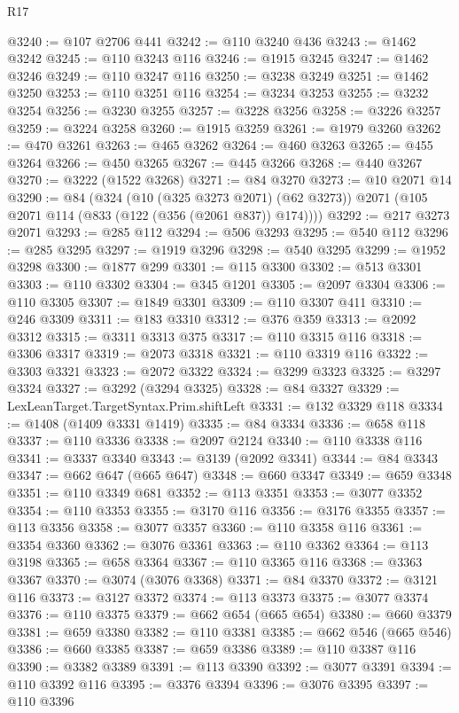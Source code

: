 \begin{lexlean}{R17}
\begin{coremodule}
@3240 := @107 @2706 @441
@3242 := @110 @3240 @436
@3243 := @1462 @3242
@3245 := @110 @3243 @116
@3246 := @1915 @3245
@3247 := @1462 @3246
@3249 := @110 @3247 @116
@3250 := @3238 @3249
@3251 := @1462 @3250
@3253 := @110 @3251 @116
@3254 := @3234 @3253
@3255 := @3232 @3254
@3256 := @3230 @3255
@3257 := @3228 @3256
@3258 := @3226 @3257
@3259 := @3224 @3258
@3260 := @1915 @3259
@3261 := @1979 @3260
@3262 := @470 @3261
@3263 := @465 @3262
@3264 := @460 @3263
@3265 := @455 @3264
@3266 := @450 @3265
@3267 := @445 @3266
@3268 := @440 @3267
@3270 := @3222 (@1522 @3268)
@3271 := @84 @3270
@3273 := @10 @2071 @14
@3290 := @84
    (@324
      (@10 (@325 @3273 @2071) (@62 @3273))
      @2071
      (@105 @2071 @114 (@833 (@122 (@356 (@2061 @837)) @174))))
@3292 := @217 @3273 @2071
@3293 := @285 @112
@3294 := @506 @3293
@3295 := @540 @112
@3296 := @285 @3295
@3297 := @1919 @3296
@3298 := @540 @3295
@3299 := @1952 @3298
@3300 := @1877 @299
@3301 := @115 @3300
@3302 := @513 @3301
@3303 := @110 @3302
@3304 := @345 @1201
@3305 := @2097 @3304
@3306 := @110 @3305
@3307 := @1849 @3301
@3309 := @110 @3307 @411
@3310 := @246 @3309
@3311 := @183 @3310
@3312 := @376 @359
@3313 := @2092 @3312
@3315 := @3311 @3313 @375
@3317 := @110 @3315 @116
@3318 := @3306 @3317
@3319 := @2073 @3318
@3321 := @110 @3319 @116
@3322 := @3303 @3321
@3323 := @2072 @3322
@3324 := @3299 @3323
@3325 := @3297 @3324
@3327 := @3292 (@3294 @3325)
@3328 := @84 @3327
@3329 := LexLeanTarget.TargetSyntax.Prim.shiftLeft
@3331 := @132 @3329 @118
@3334 := @1408 (@1409 @3331 @1419)
@3335 := @84 @3334
@3336 := @658 @118
@3337 := @110 @3336
@3338 := @2097 @2124
@3340 := @110 @3338 @116
@3341 := @3337 @3340
@3343 := @3139 (@2092 @3341)
@3344 := @84 @3343
@3347 := @662 @647 (@665 @647)
@3348 := @660 @3347
@3349 := @659 @3348
@3351 := @110 @3349 @681
@3352 := @113 @3351
@3353 := @3077 @3352
@3354 := @110 @3353
@3355 := @3170 @116
@3356 := @3176 @3355
@3357 := @113 @3356
@3358 := @3077 @3357
@3360 := @110 @3358 @116
@3361 := @3354 @3360
@3362 := @3076 @3361
@3363 := @110 @3362
@3364 := @113 @3198
@3365 := @658 @3364
@3367 := @110 @3365 @116
@3368 := @3363 @3367
@3370 := @3074 (@3076 @3368)
@3371 := @84 @3370
@3372 := @3121 @116
@3373 := @3127 @3372
@3374 := @113 @3373
@3375 := @3077 @3374
@3376 := @110 @3375
@3379 := @662 @654 (@665 @654)
@3380 := @660 @3379
@3381 := @659 @3380
@3382 := @110 @3381
@3385 := @662 @546 (@665 @546)
@3386 := @660 @3385
@3387 := @659 @3386
@3389 := @110 @3387 @116
@3390 := @3382 @3389
@3391 := @113 @3390
@3392 := @3077 @3391
@3394 := @110 @3392 @116
@3395 := @3376 @3394
@3396 := @3076 @3395
@3397 := @110 @3396

\end{coremodule}
\end{lexlean}
